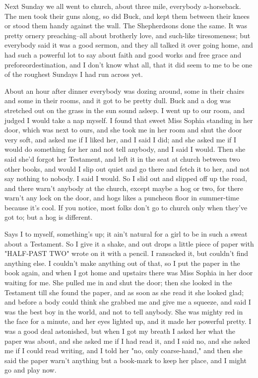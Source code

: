 Next Sunday we all went to church, about three mile, everybody
a-horseback. The men took their guns along, so did Buck, and kept them
between their knees or stood them handy against the wall.  The
Shepherdsons done the same.  It was pretty ornery preaching--all about
brotherly love, and such-like tiresomeness; but everybody said it was a
good sermon, and they all talked it over going home, and had such a
powerful lot to say about faith and good works and free grace and
preforeordestination, and I don't know what all, that it did seem to me
to be one of the roughest Sundays I had run across yet.

About an hour after dinner everybody was dozing around, some in their
chairs and some in their rooms, and it got to be pretty dull.  Buck and a
dog was stretched out on the grass in the sun sound asleep.  I went up to
our room, and judged I would take a nap myself.  I found that sweet Miss
Sophia standing in her door, which was next to ours, and she took me in
her room and shut the door very soft, and asked me if I liked her, and I
said I did; and she asked me if I would do something for her and not tell
anybody, and I said I would.  Then she said she'd forgot her Testament,
and left it in the seat at church between two other books, and would I
slip out quiet and go there and fetch it to her, and not say nothing to
nobody.  I said I would. So I slid out and slipped off up the road, and
there warn't anybody at the church, except maybe a hog or two, for there
warn't any lock on the door, and hogs likes a puncheon floor in
summer-time because it's cool.  If you notice, most folks don't go
to church only when they've got to; but a hog is different.

Says I to myself, something's up; it ain't natural for a girl to be in
such a sweat about a Testament.  So I give it a shake, and out drops a
little piece of paper with "HALF-PAST TWO" wrote on it with a pencil.  I
ransacked it, but couldn't find anything else.  I couldn't make anything
out of that, so I put the paper in the book again, and when I got home
and upstairs there was Miss Sophia in her door waiting for me.  She
pulled me in and shut the door; then she looked in the Testament till she
found the paper, and as soon as she read it she looked glad; and before a
body could think she grabbed me and give me a squeeze, and said I was the
best boy in the world, and not to tell anybody.  She was mighty red in
the face for a minute, and her eyes lighted up, and it made her powerful
pretty.  I was a good deal astonished, but when I got my breath I asked
her what the paper was about, and she asked me if I had read it, and I
said no, and she asked me if I could read writing, and I told her "no,
only coarse-hand," and then she said the paper warn't anything but a
book-mark to keep her place, and I might go and play now.

